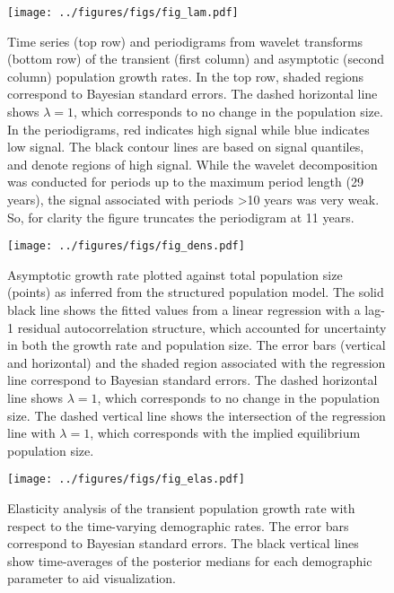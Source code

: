\documentclass[11pt]{article}
\begin{document}
\clearpage
\begin{figure}
\centering
\texttt{[image: ../figures/figs/fig\_lam.pdf]}
\caption{\label{fig:lam}
Time series (top row) and periodigrams from wavelet transforms (bottom row) 
of the transient (first column) and asymptotic (second column) population growth rates.
In the top row, shaded regions correspond to Bayesian standard errors.
The dashed horizontal line shows $\lambda=1$, 
which corresponds to no change in the population size.
In the periodigrams, red indicates high signal while blue indicates low signal. 
The black contour lines are based on signal quantiles, and denote regions of high signal.
While the wavelet decomposition was conducted for periods up to the maximum period length
(29 years), the signal associated with periods >10 years was very weak. 
So, for clarity the figure truncates the periodigram at 11 years.
}
\end{figure}
\clearpage

\clearpage
\begin{figure}
\centering
\texttt{[image: ../figures/figs/fig\_dens.pdf]}
\caption{\label{fig:dens}
Asymptotic growth rate plotted against total population size (points) as 
inferred from the structured population model.
The solid black line shows the fitted values from a linear regression with a lag-1
residual autocorrelation structure, 
which accounted for uncertainty in both the growth rate and population size.
The error bars (vertical and horizontal)
and the shaded region associated with the regression line 
correspond to Bayesian standard errors.
The dashed horizontal line shows $\lambda=1$, 
which corresponds to no change in the population size.
The dashed vertical line shows the intersection of the regression line with $\lambda=1$,
which corresponds with the implied equilibrium population size.
}
\end{figure}
\clearpage

\clearpage
\begin{figure}
\centering
\texttt{[image: ../figures/figs/fig\_elas.pdf]}
\caption{\label{fig:elas}
Elasticity analysis of the transient population growth rate 
with respect to the time-varying demographic rates.
The error bars correspond to Bayesian standard errors.
The black vertical lines show time-averages of the posterior medians 
for each demographic parameter to aid visualization.
}
\end{figure}
\clearpage
\end{document}
